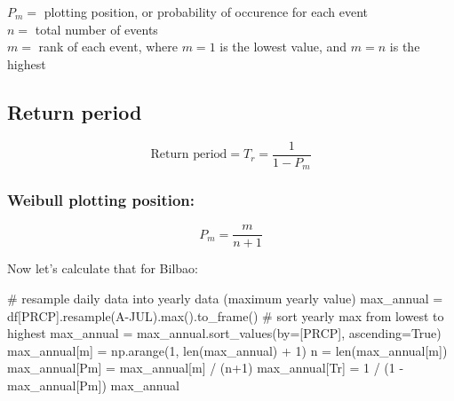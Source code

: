 \documentclass[
  letterpaper,
  DIV=11,
  numbers=noendperiod]{scrreprt}
\newenvironment{Shaded}{\begin{snugshade}}{\end{snugshade}}
\newcommand{\BuiltInTok}[1]{\textcolor[rgb]{0.00,0.23,0.31}{#1}}
\newcommand{\CommentTok}[1]{\textcolor[rgb]{0.37,0.37,0.37}{#1}}
\newcommand{\DecValTok}[1]{\textcolor[rgb]{0.68,0.00,0.00}{#1}}
\newcommand{\NormalTok}[1]{\textcolor[rgb]{0.00,0.23,0.31}{#1}}
\newcommand{\OperatorTok}[1]{\textcolor[rgb]{0.37,0.37,0.37}{#1}}
\newcommand{\StringTok}[1]{\textcolor[rgb]{0.13,0.47,0.30}{#1}}
\newcommand{\VariableTok}[1]{\textcolor[rgb]{0.07,0.07,0.07}{#1}}
\begin{document}
\(P_m=\) plotting position, or probability of occurence for each event\\
\(n=\) total number of events\\
\(m=\) rank of each event, where \(m=1\) is the lowest value, and
\(m=n\) is the highest

\hypertarget{return-period-2}{%
\subsection{Return period}\label{return-period-2}}

\[
\text{Return period} = T_r = \frac{1}{1-P_m}
\]

\hypertarget{weibull-plotting-position}{%
\subsubsection{Weibull plotting
position:}\label{weibull-plotting-position}}

\[
P_m = \frac{m}{n+1}
\]

Now let's calculate that for Bilbao:

\begin{Shaded}
\begin{Highlighting}[]
\CommentTok{\# resample daily data into yearly data (maximum yearly value)}
\NormalTok{max\_annual }\OperatorTok{=}\NormalTok{ df[}\StringTok{\textquotesingle{}PRCP\textquotesingle{}}\NormalTok{].resample(}\StringTok{\textquotesingle{}A{-}JUL\textquotesingle{}}\NormalTok{).}\BuiltInTok{max}\NormalTok{().to\_frame()}
\CommentTok{\# sort yearly max from lowest to highest}
\NormalTok{max\_annual }\OperatorTok{=}\NormalTok{ max\_annual.sort\_values(by}\OperatorTok{=}\NormalTok{[}\StringTok{\textquotesingle{}PRCP\textquotesingle{}}\NormalTok{], ascending}\OperatorTok{=}\VariableTok{True}\NormalTok{)}
\NormalTok{max\_annual[}\StringTok{\textquotesingle{}m\textquotesingle{}}\NormalTok{] }\OperatorTok{=}\NormalTok{ np.arange(}\DecValTok{1}\NormalTok{, }\BuiltInTok{len}\NormalTok{(max\_annual) }\OperatorTok{+} \DecValTok{1}\NormalTok{)}
\NormalTok{n }\OperatorTok{=} \BuiltInTok{len}\NormalTok{(max\_annual[}\StringTok{\textquotesingle{}m\textquotesingle{}}\NormalTok{])}
\NormalTok{max\_annual[}\StringTok{\textquotesingle{}Pm\textquotesingle{}}\NormalTok{] }\OperatorTok{=}\NormalTok{ max\_annual[}\StringTok{\textquotesingle{}m\textquotesingle{}}\NormalTok{] }\OperatorTok{/}\NormalTok{ (n}\OperatorTok{+}\DecValTok{1}\NormalTok{)}
\NormalTok{max\_annual[}\StringTok{\textquotesingle{}Tr\textquotesingle{}}\NormalTok{] }\OperatorTok{=} \DecValTok{1} \OperatorTok{/}\NormalTok{ (}\DecValTok{1} \OperatorTok{{-}}\NormalTok{ max\_annual[}\StringTok{\textquotesingle{}Pm\textquotesingle{}}\NormalTok{])}
\NormalTok{max\_annual}
\end{Highlighting}
\end{Shaded}
\end{document}
